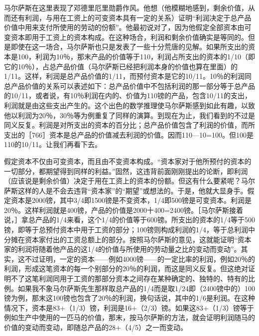 马尔萨斯在这里表现了邓德里厄里勋爵作风。他想（他模糊地感到，剩余价值，从而还有利润，与用在工资上的可变资本具有一定的关系）证明“利润决定于总产品价值中用来支付所使用的劳动的份额”。他最初说对了，因为他假定全部资本由可变资本即用于工资上的资本构成。在这种场合，利润和剩余价值确实是等同的。但是即使在这一场合，马尔萨斯也只是发表了一些十分荒唐的见解。如果所支出的资本是100，利润为10％，那末产品的价值等于110，利润占所支出的资本的1/10（即它的10％），占总产品价值（马尔萨斯已经把利润本身的价值也算在里面）的1/11。这样，利润是总产品价值的1/11，而预付资本是它的10/11。10％的利润同总产品价值的关系可以表述如下：总产品价值中不包括利润的那一部分等于总产品的10/11，或者说，有10％利润在内的、价值为110镑的产品，包含10/11的支出，利润就是由这些支出产生的。这个出色的数学推理使马尔萨斯感到如此有趣，以致他以利润为20％，30％等为例重复了同样的演算。到现在为止，我们看到的不过是同义反复。利润是对所支出的资本的百分比；总产品价值包含了利润的价值，而所支出的［766］资本是总产品的价值减去利润的价值。因而110—10=100。但100是110的10/11。让我们再看下去。

假定资本不仅由可变资本，而且由不变资本构成。“资本家对于他所预付的资本的一切部分，都期望得到同样的利益。”固然，这违背前面刚刚提出的论断，即利润（应该说是剩余价值）决定于用在工资上的资本的份额。但这有什么要紧呢？马尔萨斯这样的人是不会去违背“资本家”的“期望”或想法的。于是，他就大显身手。假定资本是2000镑，其中3/4即1500镑是不变资本，1/4即500镑是可变资本。利润是20％。这样利润就是400镑，产品的价值是2000十400=2400镑。［马尔萨斯接着说，］拿总产品的1/4来看，这个1/4的价值等于600镑。所支出的资本的1/4等于500镑，即等于总预付资本中用于工资的部分；100镑则构成利润的1/4，等于总利润中分摊在资本家付出的工资总额上的部分。按照马尔萨斯的意见，这就能证明“资本家的利润将随着他产品的这1/4的价值与所使用的劳动量之比的变动而变动”。其实，这不过证明，一定的资本——例如4000镑——的一定比率的利润，例如20％的利润，形成这笔资本的每一个别部分的20％的利润，而这是同义反复。但这绝对证明不了这笔利润同用于工资的那部分资本之间存在某种确定的、独特的、特有的比例。如果我不象马尔萨斯先生那样取总产品的1/4而是取1/24即（2400镑中的）100镑为例，那末这100镑也包含了20％的利润，换句话说，其中的1/6是利润。在这种情况下，资本是83+（1/3）镑，利润是16+（2/3）镑。如果这83+（1/3）镑等于例如生产中使用的一匹马的价值，那末，按马尔萨斯的方法，就会证明利润随马的价值的变动而变动，即随总产品的28+（4/5）之一而变动。

